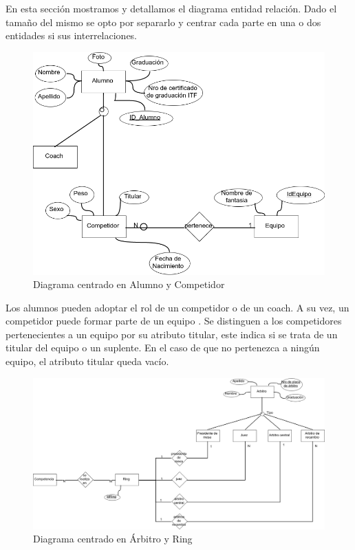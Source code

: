 En esta sección mostramos y detallamos el diagrama entidad relación. Dado el tamaño del mismo se opto por separarlo y
centrar cada parte en una o dos entidades si sus interrelaciones.

\begin{figure}[H]
  \centering
    \includegraphics[scale=0.5]{imagenes/AlumnoCompetidor.png}
  \caption{Diagrama centrado en Alumno y Competidor}
\end{figure}

Los alumnos pueden adoptar el rol de un competidor o de un coach. A su vez, un competidor puede formar parte de un equipo
. Se distinguen a los competidores pertenecientes a un equipo por su atributo titular, este indica si se trata de un titular
del equipo o un suplente. En el caso de que no pertenezca a ningún equipo, el atributo titular queda vacío.

\begin{figure}[H]
  \centering
    \includegraphics[scale=0.3]{imagenes/ArbitroRing.png}
  \caption{Diagrama centrado en Árbitro y Ring}
\end{figure}

